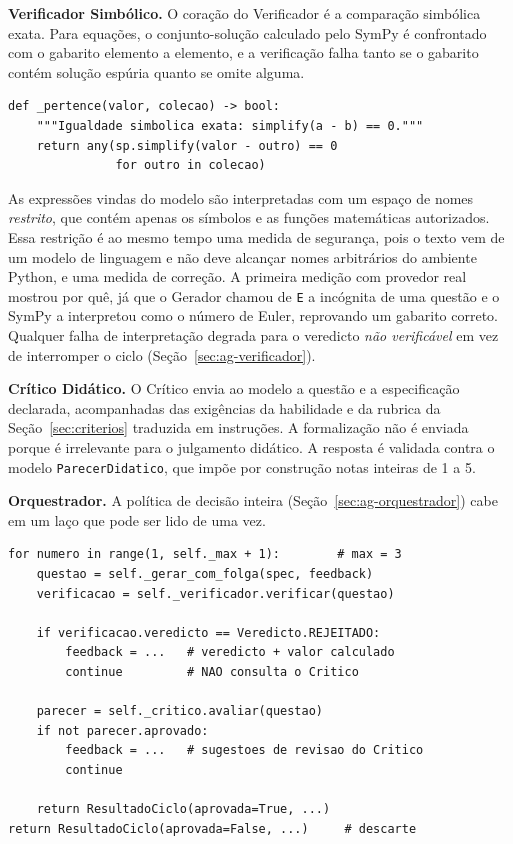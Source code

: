 \textbf{Verificador Simbólico.} O coração do Verificador é a comparação simbólica exata. Para
equações, o conjunto-solução calculado pelo SymPy é confrontado com o gabarito elemento a elemento,
e a verificação falha tanto se o gabarito contém solução espúria quanto se omite alguma.

\begin{verbatim}
def _pertence(valor, colecao) -> bool:
    """Igualdade simbolica exata: simplify(a - b) == 0."""
    return any(sp.simplify(valor - outro) == 0
               for outro in colecao)
\end{verbatim}

\noindent As expressões vindas do modelo são interpretadas com um espaço de nomes
\emph{restrito}, que contém apenas os símbolos e as funções matemáticas autorizados. Essa
restrição é ao mesmo tempo uma medida de segurança, pois o texto vem de um modelo de linguagem e não
deve alcançar nomes arbitrários do ambiente Python, e uma medida de correção. A primeira medição com
provedor real mostrou por quê, já que o Gerador chamou de \texttt{E} a incógnita de uma questão e
o SymPy a interpretou como o número de Euler, reprovando um gabarito correto. Qualquer falha de
interpretação degrada para o veredicto \emph{não verificável} em vez de interromper o ciclo
(Seção~\ref{sec:ag-verificador}).

\textbf{Crítico Didático.} O Crítico envia ao modelo a questão e a especificação declarada,
acompanhadas das exigências da habilidade e da rubrica da Seção~\ref{sec:criterios} traduzida em
instruções. A formalização não é enviada porque é irrelevante para o julgamento didático. A
resposta é validada contra o modelo \texttt{ParecerDidatico}, que impõe por construção notas
inteiras de 1 a 5.

\textbf{Orquestrador.} A política de decisão inteira (Seção~\ref{sec:ag-orquestrador}) cabe em um
laço que pode ser lido de uma vez.

\begin{verbatim}
for numero in range(1, self._max + 1):        # max = 3
    questao = self._gerar_com_folga(spec, feedback)
    verificacao = self._verificador.verificar(questao)

    if verificacao.veredicto == Veredicto.REJEITADO:
        feedback = ...   # veredicto + valor calculado
        continue         # NAO consulta o Critico

    parecer = self._critico.avaliar(questao)
    if not parecer.aprovado:
        feedback = ...   # sugestoes de revisao do Critico
        continue

    return ResultadoCiclo(aprovada=True, ...)
return ResultadoCiclo(aprovada=False, ...)     # descarte
\end{verbatim}


